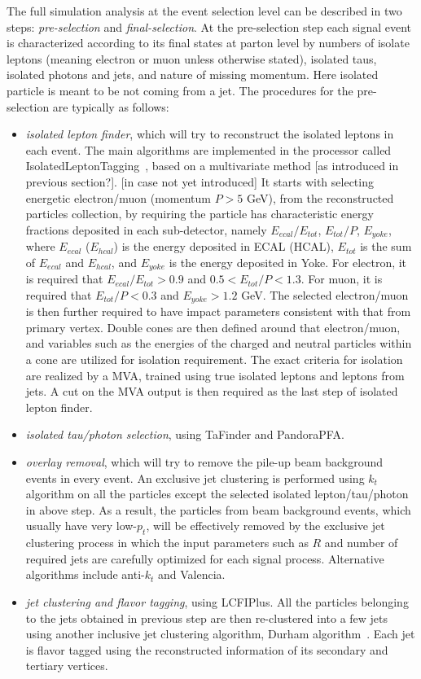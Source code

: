 The full simulation analysis at the event selection level can be described 
in two steps: {\it pre-selection} and {\it final-selection}. At the pre-selection step
each signal event is characterized according to its final states at parton level by
numbers of isolate leptons (meaning electron or muon unless otherwise stated), 
isolated taus, isolated photons and jets, and nature of missing momentum.
Here isolated particle is meant to be not coming from a jet. The procedures
for the pre-selection are typically as follows:
\begin{itemize}
\item {\it isolated lepton finder}, which will try to reconstruct the isolated leptons
in each event. The main algorithms are implemented in the processor called
IsolatedLeptonTagging~\cite{}, based on a multivariate method [as introduced in 
previous section?]. [in case not yet introduced]
It starts with selecting energetic electron/muon (momentum $P>5$ GeV), 
from the reconstructed particles collection, by requiring the particle has characteristic
energy fractions deposited in each sub-detector, namely $E_{ecal}/E_{tot}$,
$E_{tot}/P$, $E_{yoke}$, where $E_{ecal}$ ($E_{hcal}$) is the energy deposited 
in ECAL (HCAL), $E_{tot}$ is the sum of $E_{ecal}$ and $E_{hcal}$, and
$E_{yoke}$ is the energy deposited in Yoke. For electron, 
it is required that $E_{ecal}/E_{tot}>0.9$ and $0.5<E_{tot}/P<1.3$. For muon,
it is required that $E_{tot}/P<0.3$ and $E_{yoke}>1.2$ GeV. The selected
electron/muon is then further required to have impact parameters consistent with
that from primary vertex. Double cones are then defined around that electron/muon,
and variables such as the energies of the charged and neutral particles within a cone 
are utilized for isolation requirement. The exact criteria for isolation 
are realized by a MVA, trained using true isolated leptons and leptons from jets.
A cut on the MVA output is then required as the last step of isolated lepton finder.
\item {\it isolated tau/photon selection}, using TaFinder and PandoraPFA.
\item {\it overlay removal}, which will try to remove the pile-up beam background
events in every event. An exclusive jet clustering is performed using $k_t$ algorithm
on all the particles except the selected isolated lepton/tau/photon in above step. 
As a result, the particles from beam background events, which usually have very low-$p_t$, 
will be effectively removed by the exclusive jet clustering process in which the 
input parameters such as $R$ and number of required jets are carefully optimized 
for each signal process. Alternative algorithms include anti-$k_t$ and Valencia.
\item {\it jet clustering and flavor tagging}, using LCFIPlus. 
All the particles belonging to the
jets obtained in previous step are then re-clustered into a few jets using another inclusive 
jet clustering algorithm, Durham algorithm~\cite{}.
Each jet is flavor tagged using the reconstructed information of 
its secondary and tertiary vertices. 
\end{itemize}
